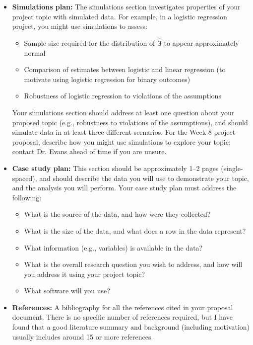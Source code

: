 \documentclass[11pt]{article}
\begin{document}
\begin{itemize}
\item \textbf{Simulations plan:} The simulations section investigates properties of your project topic with simulated data. For example, in a logistic regression project, you might use simulations to assess:
\begin{itemize}
\item Sample size required for the distribution of $\widehat{\bm{\beta}}$ to appear approximately normal
\item Comparison of estimates between logistic and linear regression (to motivate using logistic regression for binary outcomes)
\item Robustness of logistic regression to violations of the assumptions
\end{itemize}
Your simulations section should address at least one question about your proposed topic (e.g., robustness to violations of the assumptions), and should simulate data in at least three different scenarios. For the Week 8 project proposal, describe how you might use simulations to explore your topic; contact Dr. Evans ahead of time if you are unsure.

\item \textbf{Case study plan:} This section should be approximately 1--2 pages (single-spaced), and should describe the data you will use to demonstrate your topic, and the analysis you will perform. Your case study plan must address the following:

\begin{itemize}
\item What is the source of the data, and how were they collected?
\item What is the size of the data, and what does a row in the data represent?
\item What information (e.g., variables) is available in the data? 
\item What is the overall research question you wish to address, and how will you address it using your project topic?
\item What software will you use?
\end{itemize}

\item \textbf{References:} A bibliography for all the references cited in your proposal document. There is no specific number of references required, but I have found that a good literature summary and background (including motivation) usually includes around 15 or more references.

\end{itemize}
\end{document}
